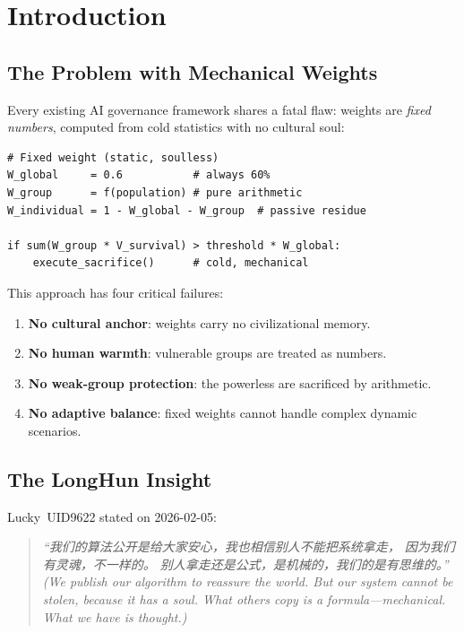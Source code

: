 \documentclass[conference]{IEEEtran}
\begin{document}
\section{Introduction}

\subsection{The Problem with Mechanical Weights}

Every existing AI governance framework shares a fatal flaw:
weights are \emph{fixed numbers}, computed from cold
statistics with no cultural soul:

\begin{lstlisting}[style=python,
  caption={Typical mechanical weight system (dead)},
  label={lst:dead}]
# Fixed weight (static, soulless)
W_global     = 0.6           # always 60%
W_group      = f(population) # pure arithmetic
W_individual = 1 - W_global - W_group  # passive residue

if sum(W_group * V_survival) > threshold * W_global:
    execute_sacrifice()      # cold, mechanical
\end{lstlisting}

This approach has four critical failures:
\begin{enumerate}
  \item \textbf{No cultural anchor}:
    weights carry no civilizational memory.
  \item \textbf{No human warmth}:
    vulnerable groups are treated as numbers.
  \item \textbf{No weak-group protection}:
    the powerless are sacrificed by arithmetic.
  \item \textbf{No adaptive balance}:
    fixed weights cannot handle complex dynamic scenarios.
\end{enumerate}

\subsection{The LongHun Insight}

Lucky~UID9622 stated on 2026-02-05:
\begin{quote}
\itshape
``我们的算法公开是给大家安心，我也相信别人不能把系统拿走，
因为我们有灵魂，不一样的。
别人拿走还是公式，是机械的，我们的是有思维的。''\\[4pt]
(\emph{We publish our algorithm to reassure the world.
But our system cannot be stolen, because it has a soul.
What others copy is a formula---mechanical.
What we have is thought.})
\end{quote}
\end{document}
